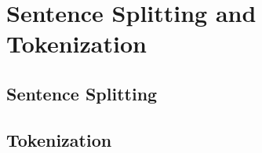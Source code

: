 \section{Sentence Splitting and Tokenization}

\subsection{Sentence Splitting}

\subsection{Tokenization}
